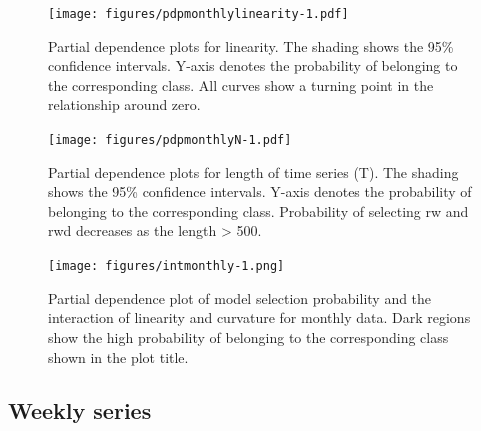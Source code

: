 \documentclass[11pt,a4paper,]{article}
\begin{document}
\begin{figure}
\centering
\texttt{[image: figures/pdpmonthlylinearity-1.pdf]}
\caption{\label{fig:pdpmonthlylinearity}Partial dependence plots for linearity. The shading shows the 95\% confidence intervals. Y-axis denotes the probability of belonging to the corresponding class. All curves show a turning point in the relationship around zero.}
\end{figure}

\begin{figure}
\centering
\texttt{[image: figures/pdpmonthlyN-1.pdf]}
\caption{\label{fig:pdpmonthlyN}Partial dependence plots for length of time series (T). The shading shows the 95\% confidence intervals. Y-axis denotes the probability of belonging to the corresponding class. Probability of selecting rw and rwd decreases as the length \textgreater{} 500.}
\end{figure}

\begin{figure}
\centering
\texttt{[image: figures/intmonthly-1.png]}
\caption{\label{fig:intmonthly}Partial dependence plot of model selection probability and the interaction of linearity and curvature for monthly data. Dark regions show the high probability of belonging to the corresponding class shown in the plot title.}
\end{figure}

\hypertarget{weekly-series}{%
\subsection{Weekly series}\label{weekly-series}}
\end{document}
